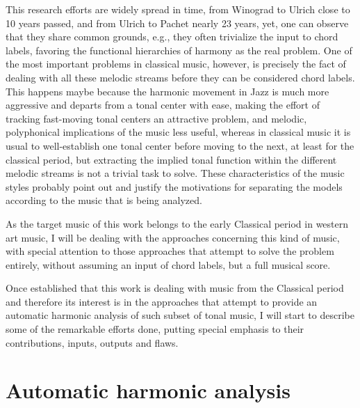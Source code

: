  This research efforts are widely spread in time, from Winograd to Ulrich close to 10 years passed, and from Ulrich to Pachet nearly 23 years, yet, one can observe that they share common grounds, e.g., they often trivialize the input to chord labels, favoring the functional hierarchies of harmony as the real problem. One of the most important problems in classical music, however, is precisely the fact of dealing with all these melodic streams before they can be considered chord labels. This happens maybe because the harmonic movement in Jazz is much more aggressive and departs from a tonal center with ease, making the effort of tracking fast-moving tonal centers an attractive problem, and melodic, polyphonical implications of the music less useful, whereas in classical music it is usual to well-establish one tonal center before moving to the next, at least for the classical period, but extracting the implied tonal function within the different melodic streams is not a trivial task to solve. These characteristics of the music styles probably point out and justify the motivations for separating the models according to the music that is being analyzed.

 As the target music of this work belongs to the early Classical period in western art music, I will be dealing with the approaches concerning this kind of music, with special attention to those approaches that attempt to solve the problem entirely, without assuming an input of chord labels, but a full musical score.

 Once established that this work is dealing with music from the Classical period and therefore its interest is in the approaches that attempt to provide an automatic harmonic analysis of such subset of tonal music, I will start to describe some of the remarkable efforts done, putting special emphasis to their contributions, inputs, outputs and flaws.

\section{Automatic harmonic analysis}

